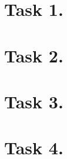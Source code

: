 \documentclass[a4paper,11pt]{article}
\begin{document}


\section*{Task 1.}
\begin{alphalist}
    \item 
    \item 
    \item 
\end{alphalist}

\section*{Task 2.}
\begin{romanlist}
    \item 
    \item 
    \item 
\end{romanlist}

\section*{Task 3.}
\begin{alphalist}
    \item 
    \item 
    \item 
\end{alphalist}

\section*{Task 4.}
\begin{alphalist}
    \item 
    \item 
    \item 
    \item 
\end{alphalist}
\end{document}
